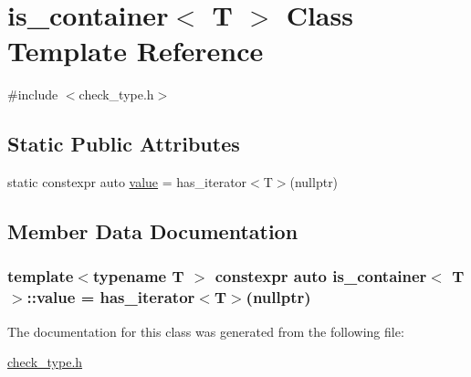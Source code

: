 \hypertarget{classis__container}{\section{is\-\_\-container$<$ T $>$ Class Template Reference}
\label{classis__container}
}


{\ttfamily \#include $<$check\-\_\-type.\-h$>$}

\subsection*{Static Public Attributes}
\begin{DoxyCompactItemize}
\item 
static constexpr auto \hyperlink{classis__container_ac4653fd3cc2c8268f003fbe2d878d48e}{value} = has\-\_\-iterator$<$T$>$(nullptr)
\end{DoxyCompactItemize}


\subsection{Member Data Documentation}
\hypertarget{classis__container_ac4653fd3cc2c8268f003fbe2d878d48e}{
\subsubsection[{value}]{\setlength{\rightskip}{0pt plus 5cm}template$<$typename T $>$ constexpr auto {\bf is\-\_\-container}$<$ T $>$\-::value = has\-\_\-iterator$<$T$>$(nullptr)\hspace{0.3cm}{\ttfamily [static]}}}\label{classis__container_ac4653fd3cc2c8268f003fbe2d878d48e}


The documentation for this class was generated from the following file\-:\begin{DoxyCompactItemize}
\item 
\hyperlink{check__type_8h}{check\-\_\-type.\-h}\end{DoxyCompactItemize}

